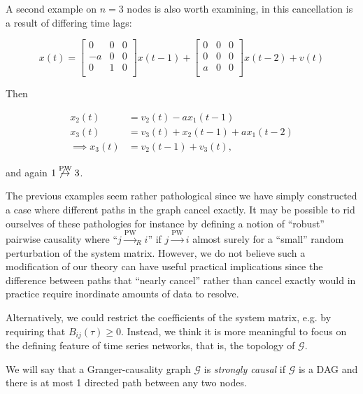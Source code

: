 \documentclass[12pt]{article}
\def\pwgc{\overset{\text{PW}}{\rightarrow}}  %
\def\gcg{\mathcal{G}}  %
\begin{document}
\begin{example}
  A second example on $n = 3$ nodes is also worth examining, in this
  cancellation is a result of differing time lags:

\begin{equation*}
  x(t) =
  \left[
    \begin{array}{ccc}
      0 & 0 & 0\\
      -a & 0 & 0\\
      0 & 1 & 0\\
    \end{array}
  \right] x(t - 1) +
  \left[
    \begin{array}{ccc}
      0 & 0 & 0\\
      0 & 0 & 0\\
      a & 0 & 0\\
    \end{array}
  \right] x(t - 2) + v(t)
\end{equation*}

Then

\begin{align*}
  x_2(t) &= v_2(t) - ax_1(t - 1)\\
  x_3(t) &= v_3(t) + x_2(t - 1) + ax_1(t - 2)\\
  \implies x_3(t) &= v_2(t - 1) + v_3(t),
\end{align*}

and again $1 \not\pwgc 3$.
\end{example}

The previous examples seem rather pathological since we have simply
constructed a case where different paths in the graph cancel exactly.
It may be possible to rid ourselves of these pathologies for instance
by defining a notion of ``robust'' pairwise causality where
``$j \pwgc _R i$'' if $j \pwgc i$ almost surely for a ``small'' random
perturbation of the system matrix.  However, we do not believe such a
modification of our theory can have useful practical implications
since the difference between paths that ``nearly cancel'' rather than
cancel exactly would in practice require inordinate amounts of data to
resolve.

Alternatively, we could restrict the coefficients of the system
matrix, e.g. by requiring that $B_{ij}(\tau) \ge 0$.  Instead, we
think it is more meaningful to focus on the defining feature of time
series networks, that is, the topology of $\gcg$.

\begin{definition}
  We will say that a Granger-causality graph $\gcg$ is \textit{strongly causal}
if $\gcg$ is a DAG and there is at most 1 directed path between any two nodes.
\end{definition}
\end{document}
